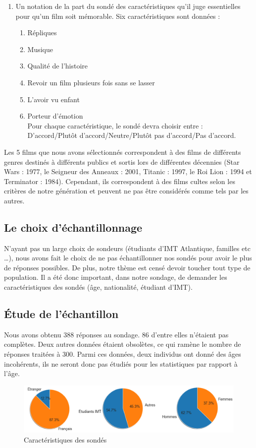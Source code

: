 \documentclass{article} %
\begin{document}
\begin{enumerate}
\begin{enumerate}
	\end{enumerate}
	\item Un notation de la part du sondé des caractéristiques qu’il juge essentielles pour qu’un film soit mémorable. Six caractéristiques sont données :
	\begin{enumerate}
		\item Répliques
		\item Musique
		\item Qualité de l’histoire
		\item Revoir un film plusieurs fois sans se lasser
		\item L’avoir vu enfant
		\item Porteur d’émotion\\Pour chaque caractéristique, le sondé devra choisir entre : D’accord/Plutôt d’accord/Neutre/Plutôt pas d’accord/Pas d’accord.
	\end{enumerate}
\end{enumerate}
Les 5 films que nous avons sélectionnés correspondent à des films de différents genres destinés à différents publics et sortis lors de différentes décennies (Star Wars : 1977, le Seigneur des Anneaux : 2001, Titanic : 1997, le Roi Lion : 1994 et Terminator : 1984). Cependant, ils correspondent à des films cultes selon les critères de notre génération et peuvent ne pas être considérés comme tels par les autres.
\subsection{ Le choix d'échantillonnage }
N’ayant pas un large choix de sondeurs (étudiants d’IMT Atlantique, familles etc …), nous avons fait le choix de ne pas échantillonner nos sondés pour avoir le plus de réponses possibles. De plus, notre thème est censé devoir toucher tout type de population. Il a été donc important, dans notre sondage, de demander les caractéristiques des sondés (âge, nationalité, étudiant d’IMT).

\subsection{Étude de l’échantillon}
Nous avons obtenu 388 réponses au sondage. 86 d’entre elles n’étaient pas complètes. Deux autres données étaient obsolètes, ce qui ramène le nombre de réponses traitées à 300. Parmi ces données, deux individus ont donné des âges incohérents, ils ne seront donc pas étudiés pour les statistiques par rapport à l’âge.\\
\begin{figure}[!h]
	\includegraphics[keepaspectratio,scale=0.6]{piechart.png}
	\caption{Caractéristiques des sondés}
\end{figure}~\\
\end{document}
